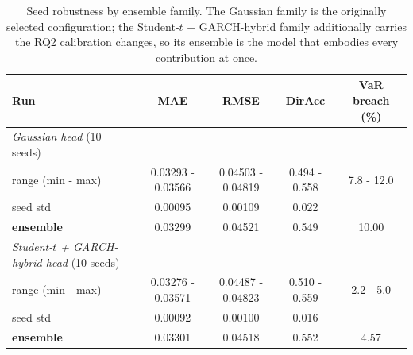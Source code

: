 \begin{table}
\caption{Seed robustness by ensemble family. The Gaussian family is the originally selected configuration; the Student-$t$ + GARCH-hybrid family additionally carries the RQ2 calibration changes, so its ensemble is the model that embodies every contribution at once.}
\label{tab:seeds}
\begin{tabular}{lcccc}
\toprule
Run & MAE & RMSE & DirAcc & VaR breach (\%) \\
\midrule
\textit{Gaussian head} (10 seeds) &  &  &  &  \\
  range (min - max) & 0.03293 - 0.03566 & 0.04503 - 0.04819 & 0.494 - 0.558 & 7.8 - 12.0 \\
  seed std & 0.00095 & 0.00109 & 0.022 &  \\
  \textbf{ensemble} & 0.03299 & 0.04521 & 0.549 & 10.00 \\
\textit{Student-$t$ + GARCH-hybrid head} (10 seeds) &  &  &  &  \\
  range (min - max) & 0.03276 - 0.03571 & 0.04487 - 0.04823 & 0.510 - 0.559 & 2.2 - 5.0 \\
  seed std & 0.00092 & 0.00100 & 0.016 &  \\
  \textbf{ensemble} & 0.03301 & 0.04518 & 0.552 & 4.57 \\
\bottomrule
\end{tabular}
\end{table}
